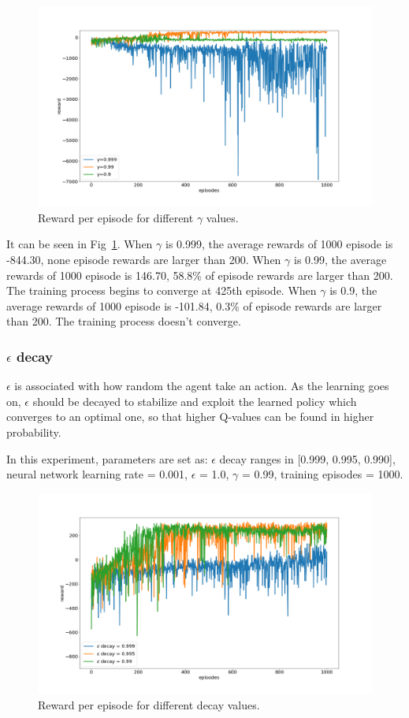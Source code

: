 \documentclass[conference]{IEEEtran}
\begin{document}
\begin{figure}[htbp]
\includegraphics[width=\linewidth]{gamma.png}
\caption{Reward per episode for different $\gamma$ values.}
\label{fig12}
\end{figure}

It can be seen in Fig~\ref{fig12}. When $\gamma$ is 0.999, the average rewards of 1000 episode is -844.30, none episode rewards are larger than 200. When $\gamma$ is 0.99, the average rewards of 1000 episode is 146.70, 58.8\% of episode rewards are larger than 200. The training process begins to converge at 425th episode. When $\gamma$ is 0.9, the average rewards of 1000 episode is -101.84, 0.3\% of episode rewards are larger than 200. The training process doesn't converge. 

\subsubsection{$\epsilon$ decay}\label{sec:ed}

$\epsilon$ is associated with how random the agent take an action. As the learning goes on, $\epsilon$ should be decayed to stabilize and exploit the learned policy which converges to an optimal one, so that higher Q-values can be found in higher probability.

In this experiment, parameters are set as: $\epsilon$ decay ranges in [0.999, 0.995, 0.990], neural network learning rate = 0.001, $\epsilon$ = 1.0, $\gamma$ = 0.99, training episodes = 1000.

\begin{figure}[htbp]
\includegraphics[width=\linewidth]{ed.png}
\caption{Reward per episode for different decay values.}
\label{fig13}
\end{figure}
\end{document}
